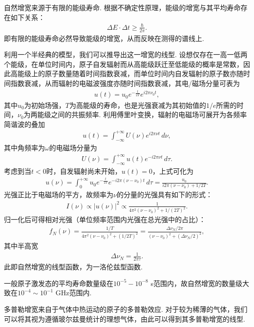 \documentclass[a4paper, 10pt]{article}
\providecommand{\abs}[1]{\left\lvert#1\right\rvert} %
\newcounter{subsubsubsection}[subsubsection]
\begin{document}
\begin{multicols}{2}
自然增宽来源于有限的能级寿命. 根据不确定性原理，能级的增宽与其平均寿命存在如下关系：
\begin{align}
    \Delta E\cdot\Delta t\geq\frac{\hbar}{2\pi}.
\end{align}
即有限的能级寿命必然导致能级的增宽，从而反映在测得的谱线上.

利用一个半经典的模型，我们可以推导出这一增宽的线型. 设想仅存在一高一低两个能级，在单位时间内，原子自发辐射而从高能级跃迁至低能级的概率是常数，因此高能级上的原子数量随着时间指数衰减，而单位时间内自发辐射的原子数亦随时间指数衰减，从而辐射的电磁波强度亦随时间指数衰减，其电/磁场分量可表为
\begin{align}
    u(t)=u_0e^{-\frac{t}{2T}}e^{i2\pi\nu_0t},
\end{align}
其中$u_0$为初始场强，$T$为高能级的寿命，也是光强衰减为其初始值的$1/e$所需的时间，$\nu_0$为两能级之间的共振频率.
利用傅里叶变换，辐射的电磁场可展开为各频率简谐波的叠加
\begin{align}
    u(t)=\int_{-\infty}^{+\infty}U(\nu)e^{i2\pi\nu t}\,d\nu,
\end{align}
其中角频率为$\omega$的电磁场分量为
\begin{align}
    U(\nu)=\int_{-\infty}^{+\infty}u(t)e^{-i2\pi\nu t}\,d\tau.
\end{align}
考虑到当$t<0$时，自发辐射尚未开始，$u(t)=0$，上式可化为
\begin{align}
    u(\nu)=\int_0^{+\infty}u_0e^{-\frac{t}{2T}}e^{-i2\pi(\nu-\nu_0)t}\,d\tau=\frac{u_0}{i2\pi(\nu-\nu_0)+1/2T}.
\end{align}
光强正比于电磁场的平方，故频率为$\nu$的分量的光强具有如下的形式：
\begin{align}
    I(\nu)\propto\abs{u(\nu)}^2\propto\frac{1}{4\pi^2(\nu-\nu_0)^2+1/(2T)^2}.
\end{align}
归一化后可得相对光强（单位频率范围内光强在总光强中的占比）：
\begin{align}
    f_N(\nu)=\frac{1/T}{4\pi^2(\nu-\nu_0)^2+(1/2T)^2}=\frac{\Delta\nu_N/2\pi}{(\nu-\nu_0)^2+(\Delta\nu_N/2)^2},
\end{align}
其中半高宽
\begin{align}
    \label{nature-width}
    \Delta\nu_N=\frac{1}{2\pi\tau}.
\end{align}
此即自然增宽的线型函数，为一洛伦兹型函数.

一般原子激发态的平均寿命数量级在$10^{-5}-10^{-8}$ s范围内，故自然增宽的数量级大致在$10^{-4}\sim 10^{-1}$ GHz范围内.

多普勒增宽来自于气体中热运动的原子的多普勒效应. 对于较为稀薄的气体，我们可以将其视为遵循玻尔兹曼统计的理想气体，由此可以得到其多普勒增宽的线型.


\end{multicols}
\end{document}
